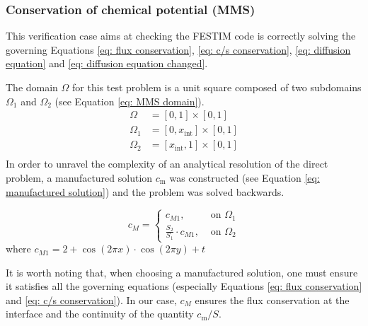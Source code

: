 \subsubsection{Conservation of chemical potential (MMS)}

This verification case aims at checking the FESTIM code is correctly solving the governing Equations \ref{eq: flux conservation}, \ref{eq: c/s conservation}, \ref{eq: diffusion equation} and \ref{eq: diffusion equation changed}.

The domain $\Omega$ for this test problem is a unit square composed of two subdomains $\Omega_1$ and $\Omega_2$ (see Equation \ref{eq: MMS domain}).
\begin{subequations} \label{eq: MMS domain}
\begin{align}
    \Omega &= [0, 1] \times [0, 1] \\
    \Omega_1 &= [0, x_\mathrm{int}] \times [0, 1] \\
    \Omega_2 &= [x_\mathrm{int}, 1] \times [0, 1] \\
\end{align}
\end{subequations}
In order to unravel the complexity of an analytical resolution of the direct problem, a manufactured solution $c_\mathrm{m}$ was constructed (see Equation \ref{eq: manufactured solution}) and the problem was solved backwards.

\begin{equation}
        c_M= 
\begin{cases}
    c_{M1},& \text{ on } \Omega_1\\
    \frac{S_2}{S_1} \cdot c_{M1},& \text{ on } \Omega_2
\end{cases}
\label{eq: manufactured solution}
\end{equation}
where $c_{M1} = 2 + \cos(2\pi x) \cdot \cos(2\pi y) + t$

It is worth noting that, when choosing a manufactured solution, one must ensure it satisfies all the governing equations (especially Equations \ref{eq: flux conservation} and \ref{eq: c/s conservation}).
In our case, $c_M$ ensures the flux conservation at the interface and the continuity of the quantity $c_\mathrm{m}/S$.

